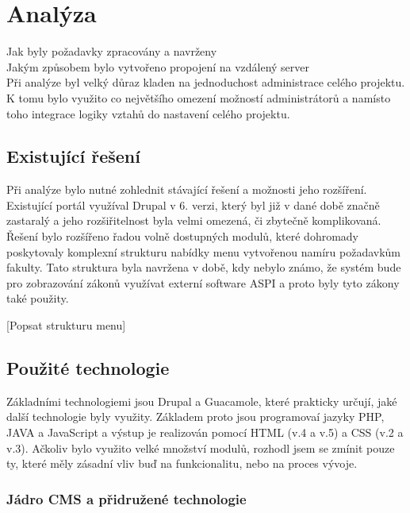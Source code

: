 \chapter{Analýza}
\label{chap:analyza}
Jak byly požadavky zpracovány a navrženy \\
Jakým způsobem bylo vytvořeno propojení na vzdálený server \\
Při analýze byl velký důraz kladen na jednoduchost administrace celého projektu. K tomu bylo využito co největšího omezení možností administrátorů a namísto toho integrace logiky vztahů do nastavení celého projektu.

\section{Existující řešení}
Při analýze bylo nutné zohlednit stávající řešení a možnosti jeho rozšíření. Existující portál využíval Drupal v 6. verzi, který byl již v dané době značně zastaralý a jeho rozšiřitelnost byla velmi omezená, či zbytečně komplikovaná. Řešení bylo rozšířeno řadou volně dostupných modulů, které dohromady poskytovaly komplexní strukturu nabídky menu vytvořenou namíru požadavkům fakulty. Tato struktura byla navržena v době, kdy nebylo známo, že systém bude pro zobrazování zákonů využívat externí software ASPI a proto byly tyto zákony také použity. 

[Popsat strukturu menu]

\section{Použité technologie}
\label{sec:technologies}

Základními technologiemi jsou Drupal a Guacamole, které prakticky určují, jaké další technologie byly využity. Základem proto jsou programovaí jazyky PHP, JAVA a JavaScript a výstup je realizován pomocí HTML (v.4 a v.5) a CSS (v.2 a v.3). Ačkoliv bylo využito velké množství modulů, rozhodl jsem se zmínit pouze ty, které měly zásadní vliv buď na funkcionalitu, nebo na proces vývoje.

\subsection{Jádro CMS a přidružené technologie}

